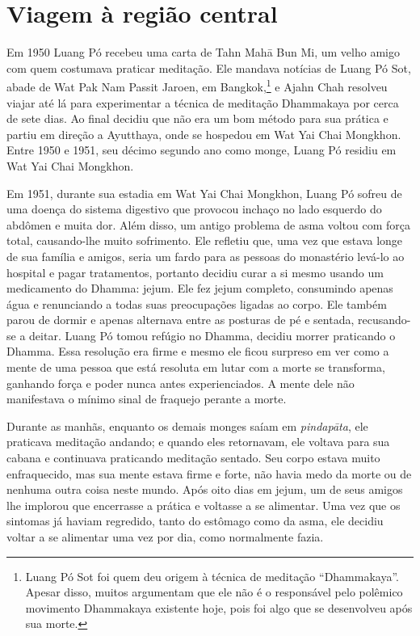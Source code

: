 \thistitleoffsettrue
\chapter{Viagem à região central}

Em 1950 Luang Pó recebeu uma carta de Tahn Mahā Bun Mi, um velho amigo
com quem costumava praticar meditação. Ele mandava notícias de Luang Pó
Sot, abade de Wat Pak Nam Passit Jaroen, em Bangkok,\footnote{Luang Pó
  Sot foi quem deu origem à técnica de meditação ``Dhammakaya''. Apesar
  disso, muitos argumentam que ele não é o responsável pelo polêmico
  movimento Dhammakaya existente hoje, pois foi algo que se desenvolveu
  após sua morte.} e Ajahn Chah resolveu viajar até lá para
experimentar a técnica de meditação Dhammakaya por cerca de sete dias.
Ao final decidiu que não era um bom método para sua prática e partiu em
direção a Ayutthaya, onde se hospedou em Wat Yai Chai Mongkhon. Entre
1950 e 1951, seu décimo segundo ano como monge, Luang Pó residiu em Wat
Yai Chai Mongkhon.

Em 1951, durante sua estadia em Wat Yai Chai Mongkhon, Luang Pó sofreu
de uma doença do sistema digestivo que provocou inchaço no lado esquerdo
do abdômen e muita dor. Além disso, um antigo problema de asma voltou
com força total, causando-lhe muito sofrimento. Ele refletiu que, uma
vez que estava longe de sua família e amigos, seria um fardo para as
pessoas do monastério levá-lo ao hospital e pagar tratamentos, portanto
decidiu curar a si mesmo usando um medicamento do Dhamma: jejum. Ele fez
jejum completo, consumindo apenas água e renunciando a todas suas
preocupações ligadas ao corpo. Ele também parou de dormir e apenas
alternava entre as posturas de pé e sentada, recusando-se a deitar.
Luang Pó tomou refúgio no Dhamma, decidiu morrer praticando o Dhamma.
Essa resolução era firme e mesmo ele ficou surpreso em ver como a mente
de uma pessoa que está resoluta em lutar com a morte se transforma,
ganhando força e poder nunca antes experienciados. A mente dele não
manifestava o mínimo sinal de fraquejo perante a morte.

Durante as manhãs, enquanto os demais monges saíam em \emph{pindapāta},
ele praticava meditação andando; e quando eles retornavam, ele voltava
para sua cabana e continuava praticando meditação sentado. Seu corpo
estava muito enfraquecido, mas sua mente estava firme e forte, não havia
medo da morte ou de nenhuma outra coisa neste mundo. Após oito dias em
jejum, um de seus amigos lhe implorou que encerrasse a prática e
voltasse a se alimentar. Uma vez que os sintomas já haviam regredido,
tanto do estômago como da asma, ele decidiu voltar a se alimentar uma
vez por dia, como normalmente fazia.

